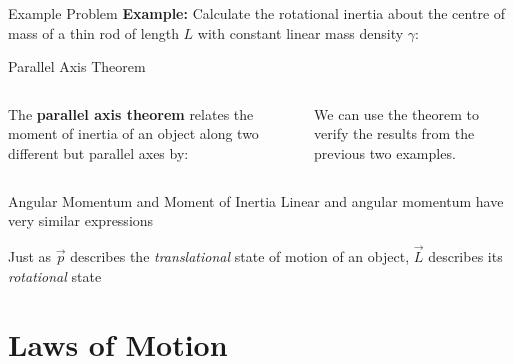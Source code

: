 \documentclass[12pt,compress,aspectratio=169]{beamer}
\begin{document}
\begin{frame}[t]{Example Problem}
  \textbf{Example:} Calculate the rotational inertia about the centre of mass
  of a thin rod of length $L$ with constant linear mass density $\gamma$:
  \begin{center}
  \end{center}
\end{frame}



\begin{frame}{Parallel Axis Theorem}
  \begin{columns}
    \centering
    
    The \textbf{parallel axis theorem} relates the moment of inertia of an
    object along two different but parallel axes by:


    We can use the theorem to verify the results from the previous two examples.
  \end{columns}
\end{frame}




\begin{frame}{Angular Momentum and Moment of Inertia}
  Linear and angular momentum have very similar expressions
    
  \vspace{-.3in}{\large
    \begin{align*}
      \vec p &= m\vec v\\
      \vec L &= I\vec\omega
    \end{align*}
  }
  
  Just as $\vec p$ describes the \emph{translational} state of motion of an
  object, $\vec L$ describes its \emph{rotational} state
\end{frame}



\section{Laws of Motion}
\end{document}
